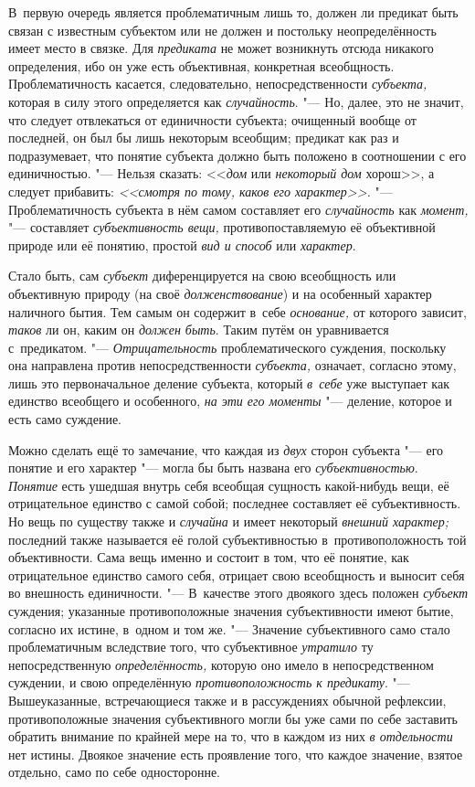 \label{bkm:bm66a}В~первую очередь является проблематичным лишь
то, должен ли предикат быть связан с известным субъектом или не должен и
постольку неопределённость имеет место в связке. Для {\em предиката} не может
возникнуть отсюда никакого определения, ибо он уже есть объективная,
конкретная всеобщность. Проблематичность касается, следовательно,
непосредственности {\em субъекта,} которая в силу этого определяется как
{\em случайность}. "--- Но,
далее, это не значит, что следует отвлекаться от единичности субъекта;
очищенный вообще от последней, он был бы лишь некоторым всеобщим; предикат
как раз и подразумевает, что понятие субъекта должно быть положено в
соотношении с его единичностью. "--- Нельзя сказать: <<{\em дом} или
{\em некоторый дом} хорош>>, а следует прибавить: {\em <<смотря по тому,
каков его характер>>.} "--- Проблематичность субъекта в нём самом
составляет его {\em случайность} как {\em момент,} "--- составляет
{\em субъективность вещи,} противопоставляемую её объективной природе
или её понятию, простой {\em вид и способ} или {\em характер}.

Стало быть, сам {\em субъект} диференцируется на свою всеобщность или
объективную природу (на своё {\em долженствование})
и на особенный характер наличного бытия. Тем самым он
содержит в~себе {\em основание,} от которого зависит, {\em таков} ли он,
каким он {\em должен быть}. Таким путём он уравнивается
с~предикатом. "--- {\em Отрицательность} проблематического суждения,
поскольку она направлена против непосредственности {\em субъекта,}
означает, согласно этому, лишь это первоначальное деление субъекта,
который {\em в~себе} уже выступает как единство всеобщего и особенного,
{\em на эти его моменты} "--- деление, которое и есть само суждение.

Можно сделать ещё то замечание, что каждая из {\em двух} сторон
субъекта "--- его понятие и его характер "--- могла бы быть названа его
{\em субъективностью}. \label{bkm:bm01a}{\em Понятие}
есть ушедшая внутрь себя всеобщая сущность какой-нибудь вещи,
её отрицательное единство с самой собой; последнее составляет её
субъективность. Но вещь по существу также и {\em случайна} и имеет некоторый
{\em внешний характер;} последний также называется её голой субъективностью
в~противоположность той объективности. Сама вещь именно и состоит в том, что
её понятие, как отрицательное единство самого себя, отрицает свою
всеобщность и выносит себя во внешность
единичности. "--- В~качестве этого двоякого здесь положен {\em субъект}
суждения; указанные противоположные значения субъективности имеют бытие,
согласно их истине, в~одном и том же. "--- Значение субъективного само
стало проблематичным вследствие того, что субъективное {\em утратило} ту
непосредственную {\em определённость,} которую оно имело в непосредственном
суждении, и свою определённую {\em противоположность к
предикату}. "--- Вышеуказанные, встречающиеся также и
в рассуждениях обычной рефлексии, противоположные значения субъективного
могли бы уже сами по себе заставить обратить внимание по крайней мере на
то, что в каждом из них {\em в отдельности} нет истины. Двоякое значение
есть проявление того, что каждое значение, взятое отдельно, само по себе
односторонне.


